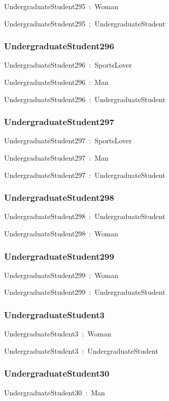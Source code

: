 \documentclass{article}
\begin{document}
UndergraduateStudent295~:~Woman

UndergraduateStudent295~:~UndergraduateStudent

\subsubsection*{UndergraduateStudent296}

UndergraduateStudent296~:~SportsLover

UndergraduateStudent296~:~Man

UndergraduateStudent296~:~UndergraduateStudent

\subsubsection*{UndergraduateStudent297}

UndergraduateStudent297~:~SportsLover

UndergraduateStudent297~:~Man

UndergraduateStudent297~:~UndergraduateStudent

\subsubsection*{UndergraduateStudent298}

UndergraduateStudent298~:~UndergraduateStudent

UndergraduateStudent298~:~Woman

\subsubsection*{UndergraduateStudent299}

UndergraduateStudent299~:~Woman

UndergraduateStudent299~:~UndergraduateStudent

\subsubsection*{UndergraduateStudent3}

UndergraduateStudent3~:~Woman

UndergraduateStudent3~:~UndergraduateStudent

\subsubsection*{UndergraduateStudent30}

UndergraduateStudent30~:~Man
\end{document}
